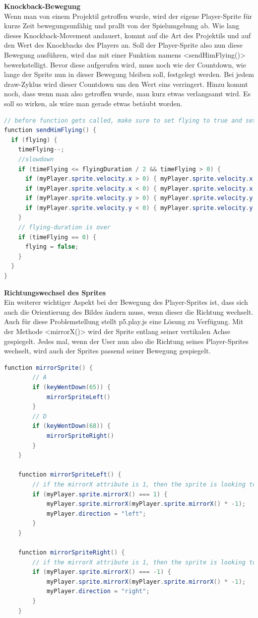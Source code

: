 \textbf{Knockback-Bewegung} \\
Wenn man von einem Projektil getroffen wurde, wird der eigene Player-Sprite für kurze Zeit bewegungsunfähig und prallt von der Spielumgebung ab.
Wie lang dieses Knockback-Movement andauert, kommt auf die Art des Projektils und auf den Wert des Knockbacks des Players an.
Soll der Player-Sprite also nun diese Bewegung ausführen, wird das mit einer Funktion namens <sendHimFlying()> bewerkstelligt.
Bevor diese aufgerufen wird, muss noch wie der Countdown, wie lange der Sprite nun in dieser Bewegung bleiben soll, festgelegt werden. Bei jedem draw-Zyklus wird dieser Countdown um den Wert eins verringert.
Hinzu kommt noch, dass wenn man also getroffen wurde, man kurz etwas verlangsamt wird. Es soll so wirken, als wäre man gerade etwas betäubt worden.
\begin{lstlisting}[caption=Knockback-Bewegung,language=Java,label=lst:impl:knockbackMov]
// before function gets called, make sure to set flying to true and set a flying-duration
function sendHimFlying() {
  if (flying) {
    timeFlying--;
    //slowdown 
    if (timeFlying <= flyingDuration / 2 && timeFlying > 0) {
      if (myPlayer.sprite.velocity.x > 0) { myPlayer.sprite.velocity.x -= 0.3; }
      if (myPlayer.sprite.velocity.x < 0) { myPlayer.sprite.velocity.x += 0.3; }
      if (myPlayer.sprite.velocity.y > 0) { myPlayer.sprite.velocity.y -= 0.3; }
      if (myPlayer.sprite.velocity.y < 0) { myPlayer.sprite.velocity.y += 0.3; }
    }
    // flying-duration is over
    if (timeFlying == 0) {
      flying = false;
    }
  }
}
\end{lstlisting}


\textbf{Richtungswechsel des Sprites}
\\
Ein weiterer wichtiger Aspekt bei der Bewegung des Player-Sprites ist, dass sich auch die Orientierung des Bildes ändern muss, wenn dieser die Richtung wechselt.
Auch für diese Problemstellung stellt p5.play.js eine Lösung zu Verfügung. Mit der Methode <mirrorX()> wird der Sprite entlang seiner vertikalen Achse gespiegelt.
Jedes mal, wenn der User nun also die Richtung seines Player-Sprites wechselt, wird auch der Sprites passend seiner Bewegung gespiegelt.

\begin{lstlisting}[caption=Sprite Richtungswechsel,language=Java,label=lst:impl:mirrorSprite]
    function mirrorSprite() {
        // A
        if (keyWentDown(65)) {
            mirrorSpriteLeft()
        }
        // D
        if (keyWentDown(68)) {
            mirrorSpriteRight()
        }
    }
    
    function mirrorSpriteLeft() {
        // if the mirrorX attribute is 1, then the sprite is looking to the right
        if (myPlayer.sprite.mirrorX() === 1) {
            myPlayer.sprite.mirrorX(myPlayer.sprite.mirrorX() * -1);
            myPlayer.direction = "left";
        }
    }
    
    function mirrorSpriteRight() {
        // if the mirrorX attribute is 1, then the sprite is looking to the left
        if (myPlayer.sprite.mirrorX() === -1) {
            myPlayer.sprite.mirrorX(myPlayer.sprite.mirrorX() * -1);
            myPlayer.direction = "right";
        }
    }
\end{lstlisting}

